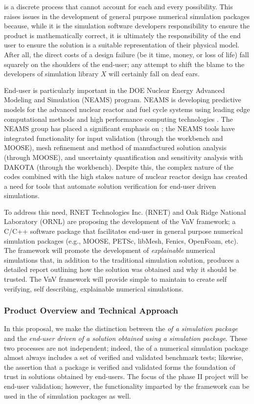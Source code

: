 \VV is a discrete process that cannot account for each and every possibility. This raises issues in the development of general purpose numerical simulation packages because, while it is the simulation software developers responsibility to ensure the product is mathematically correct, it is ultimately the responsibility of the end user to ensure the solution is a suitable representation of their physical model. After all, the direct costs of a design failure (be it time, money, or loss of life) fall squarely on the shoulders of the end-user; any attempt to shift the blame to the developers of simulation library $X$ will certainly fall on deaf ears. 

End-user \VV is particularly important in the DOE Nuclear Energy Advanced Modeling and Simulation (NEAMS) program. NEAMS is developing predictive models for the advanced nuclear reactor and fuel cycle systems using leading edge computational methods and high performance computing technologies \cite{NEAMS}. The NEAMS group has placed a significant emphasis on \VV \cite{NEAMSVV}; the NEAMS tools have integrated functionality for input validation (through the workbench and MOOSE), mesh refinement and method of manufactured solution analysis (through MOOSE), and uncertainty quantification and sensitivity analysis with DAKOTA (through the workbench). Despite this, the complex nature of the codes combined with the high stakes nature of nuclear reactor design has created a need for tools that automate solution verification for end-user driven simulations. 

To address this need, RNET Technologies Inc. (RNET) and Oak Ridge National Laboratory (ORNL) are proposing the development of the VnV framework; a C/C++ software package that facilitates end-user \VV in general purpose numerical simulation packages (e.g., MOOSE, PETSc, libMesh, Fenics, OpenFoam, etc). The framework will promote the development of \emph{explainable} numerical simulations that, in addition to the traditional simulation solution, produces a detailed report outlining how the solution was obtained and why it should be trusted. The VnV framework will provide simple to maintain \VV to create self verifying, self describing, explainable numerical simulations. 

\subsubsection{Product Overview and Technical Approach}

In this proposal, we make the distinction between the \emph{\VV of a simulation package} and the \emph{end-user driven \VV of a solution obtained using a simulation package}. These two processes are not independent; indeed, the \VV of a numerical simulation 
package almost always includes a set of verified and validated benchmark tests; likewise, the assertion that a package is verified and validated forms the foundation of trust in solutions obtained by end-users. The focus of the phase II project will be end-user validation; however,  the functionality imparted by the framework can be used in the \VV of simulation packages as well. 

